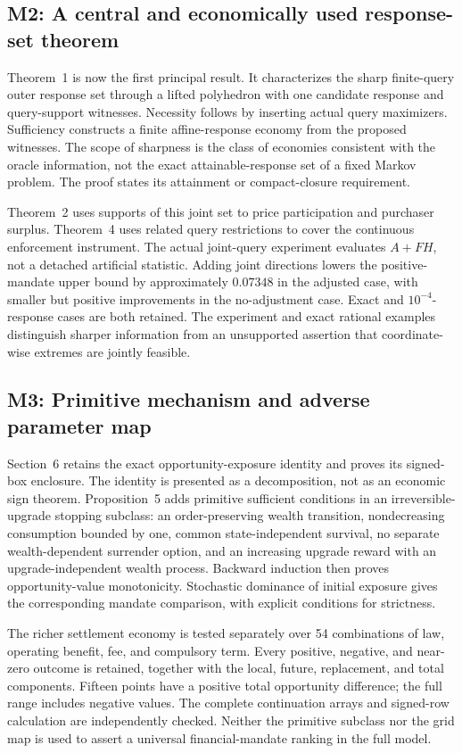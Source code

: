 \subsection{M2: A central and economically used response-set theorem}
Theorem~1 is now the first principal result. It characterizes the sharp finite-query outer response set through a lifted polyhedron with one candidate response and query-support witnesses. Necessity follows by inserting actual query maximizers. Sufficiency constructs a finite affine-response economy from the proposed witnesses. The scope of sharpness is the class of economies consistent with the oracle information, not the exact attainable-response set of a fixed Markov problem. The proof states its attainment or compact-closure requirement.

Theorem~2 uses supports of this joint set to price participation and purchaser surplus. Theorem~4 uses related query restrictions to cover the continuous enforcement instrument. The actual joint-query experiment evaluates $A+FH$, not a detached artificial statistic. Adding joint directions lowers the positive-mandate upper bound by approximately $0.07348$ in the adjusted case, with smaller but positive improvements in the no-adjustment case. Exact and $10^{-4}$-response cases are both retained. The experiment and exact rational examples distinguish sharper information from an unsupported assertion that coordinate-wise extremes are jointly feasible.

\subsection{M3: Primitive mechanism and adverse parameter map}
Section~6 retains the exact opportunity-exposure identity and proves its signed-box enclosure. The identity is presented as a decomposition, not as an economic sign theorem. Proposition~5 adds primitive sufficient conditions in an irreversible-upgrade stopping subclass: an order-preserving wealth transition, nondecreasing consumption bounded by one, common state-independent survival, no separate wealth-dependent surrender option, and an increasing upgrade reward with an upgrade-independent wealth process. Backward induction then proves opportunity-value monotonicity. Stochastic dominance of initial exposure gives the corresponding mandate comparison, with explicit conditions for strictness.

The richer settlement economy is tested separately over 54 combinations of law, operating benefit, fee, and compulsory term. Every positive, negative, and near-zero outcome is retained, together with the local, future, replacement, and total components. Fifteen points have a positive total opportunity difference; the full range includes negative values. The complete continuation arrays and signed-row calculation are independently checked. Neither the primitive subclass nor the grid map is used to assert a universal financial-mandate ranking in the full model.

